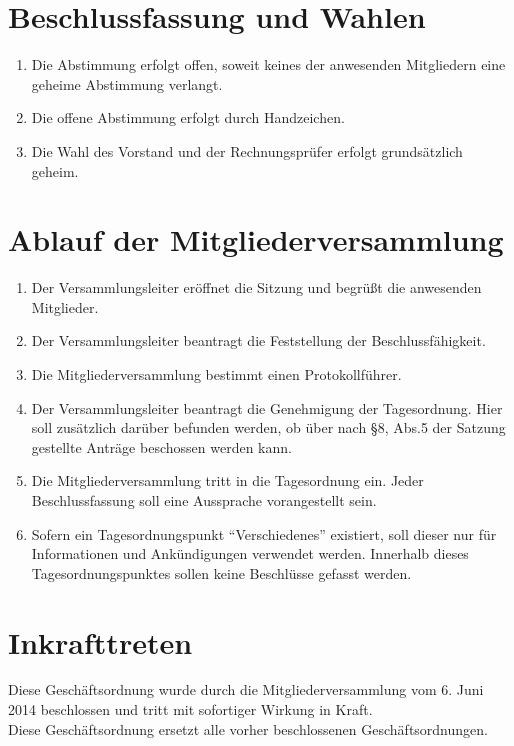 \documentclass[a4paper, 12pt]{scrartcl}
\begin{document}
\section{Beschlussfassung und Wahlen}
\begin{enumerate}
	\item Die Abstimmung erfolgt offen, soweit keines der anwesenden Mitgliedern eine geheime Abstimmung verlangt.
	\item Die offene Abstimmung erfolgt durch Handzeichen.
	\item Die Wahl des Vorstand und der Rechnungsprüfer erfolgt grundsätzlich geheim.
\end{enumerate}

\section{Ablauf der Mitgliederversammlung}
\begin{enumerate} 
	\item Der Versammlungsleiter eröffnet die Sitzung und begrüßt die anwesenden Mitglieder.
	\item Der Versammlungsleiter beantragt die Feststellung der Beschlussfähigkeit.
	\item Die Mitgliederversammlung bestimmt einen Protokollführer.
	\item Der Versammlungsleiter beantragt die Genehmigung der Tagesordnung. Hier soll zusätzlich darüber befunden werden, ob über nach §8, Abs.5 der Satzung gestellte Anträge beschossen werden kann.
	\item Die Mitgliederversammlung tritt in die Tagesordnung ein. Jeder Beschlussfassung soll eine Aussprache vorangestellt sein.
	\item Sofern ein Tagesordnungspunkt "`Verschiedenes"' existiert, soll dieser nur für Informationen und Ankündigungen verwendet werden. Innerhalb dieses Tagesordnungspunktes sollen keine Beschlüsse gefasst werden.
\end{enumerate}

\section{Inkrafttreten}
Diese Geschäftsordnung wurde durch die Mitgliederversammlung vom 6. Juni 2014 beschlossen und tritt mit sofortiger Wirkung in Kraft.\\
Diese Geschäftsordnung ersetzt alle vorher beschlossenen Geschäftsordnungen.
\end{document}

